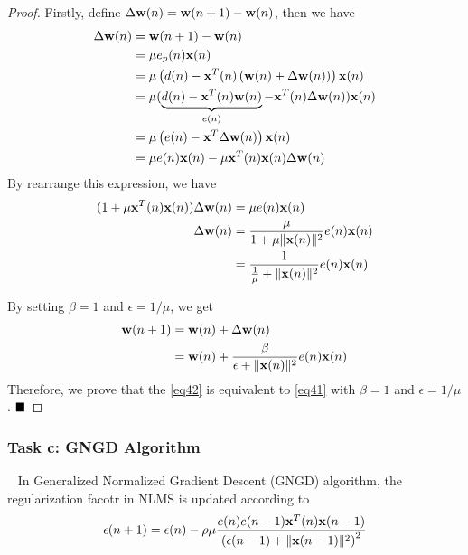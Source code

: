 \documentclass[10pt]{article}
\newtheorem*{proof}{Proof}[section]
\begin{document}
\begin{proof}
	Firstly, define $\Delta {\bf{w}}(n) = {\bf{w}}(n+1) - {\bf{w}}(n)$, then we have
	\begin{align}
		\Delta{\bf{w}}(n) & = {\bf{w}}(n+1) - {\bf{w}}(n) \nonumber \\
		& = \mu e_p(n) {\bf{x}}(n) \\
		& = \mu \left( d(n) - {\bf{x}}^T(n) \left( {\bf{w}}(n) + \Delta {\bf{w}}(n) \right) \right) {\bf{x}}(n) \nonumber \\
		& = \mu ( \underbrace{d(n) - {\bf{x}}^T(n) {\bf{w}}(n)}_{e(n)} -{\bf{x}}^T(n)  \Delta {\bf{w}}(n)  ) {\bf{x}}(n) \nonumber \\
		& = \mu \left( e(n) - {\bf{x}}^T \Delta{\bf{w}}(n) \right) {\bf{x}}(n) \nonumber \\
		& = \mu e(n) {\bf{x}}(n) - \mu {\bf{x}}^T(n) {\bf{x}}(n) \Delta {\bf{w}}(n)
	\end{align}
	By rearrange this expression, we have
	\begin{align}
		( 1 + \mu {\bf{x}}^T(n) {\bf{x}}(n)) \Delta {\bf{w}}(n) & = \mu e(n) {\bf{x}}(n)\\
		\Delta {\bf{w}}(n) &= \frac{\mu}{1 + \mu \Vert {\bf{x}}(n) \Vert^2} e(n) {\bf{x}}(n) \nonumber \\
		& = \frac{1}{\frac{1}{\mu} + \Vert {\bf{x}}(n) \Vert^2} e(n) {\bf{x}}(n)
	\end{align}

	By setting $\beta=1$ and $\epsilon = 1 / \mu$, we get
	\begin{align}
		{\bf{w}}(n+1) & = {\bf{w}}(n) + \Delta {\bf{w}}(n) \nonumber \\
		& = {\bf{w}}(n) + \frac{\beta}{\epsilon + \Vert {\bf{x}}(n) \Vert^2} e(n) {\bf{x}}(n)
	\end{align}
	Therefore, we prove that the \eqref{eq42} is equivalent to \eqref{eq41} with $\beta=1$ and $\epsilon=1/ \mu$.
 $\hfill\blacksquare$ 
\end{proof}

\subsubsection{Task c: GNGD Algorithm}
\ \indent
In Generalized Normalized Gradient Descent (GNGD) algorithm, the regularization facotr in NLMS is 
updated according to
\begin{equation}
	\epsilon (n+1) = \epsilon (n) - \rho \mu \frac{ e(n) e(n-1) {\bf{x}}^T(n) {\bf{x}}(n-1) }{ \left( \epsilon(n-1) + \Vert  {\bf{x}}(n-1) \Vert^2 \right)^2 }
\end{equation} 
\end{document}
